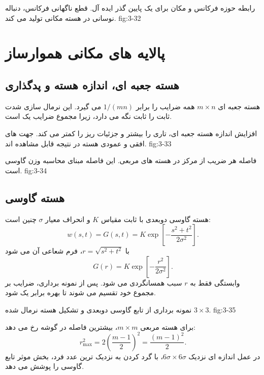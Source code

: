 {رابطه حوزه فرکانس و مکان برای یک پایین گذر ایده آل. قطع ناگهانی فرکانس، دنباله
نوسانی در هسته مکانی تولید می کند.}
{fig:3-32}

\section{پالایه های مکانی هموارساز}

\subsection{هسته جعبه ای، اندازه هسته و پدگذاری}

هسته جعبه ای \(m\times n\) همه ضرایب را برابر \(1/(mn)\) می گیرد. این
نرمال سازی شدت ثابت را ثابت نگه می دارد، زیرا مجموع ضرایب یک است.

{افزایش اندازه هسته جعبه ای، تاری را بیشتر و جزئیات ریز را کمتر می کند. جهت
های افقی و عمودی هسته در نتیجه قابل مشاهده اند.}
{fig:3-33}

{فاصله هر ضریب از مرکز در هسته های مربعی. این فاصله مبنای محاسبه وزن گاوسی
است.}
{fig:3-34}

\subsection{هسته گاوسی}

هسته گاوسی دوبعدی با ثابت مقیاس \(K\) و انحراف معیار \(\sigma\) چنین است:
\begin{equation}
  w(s,t)=G(s,t)=K\exp\!\left[-\frac{s^2+t^2}{2\sigma^2}\right].
  \tag{3-45}\label{eq:3-45}
\end{equation}
با \(r=\sqrt{s^2+t^2}\)، فرم شعاعی آن می شود
\begin{equation}
  G(r)=K\exp\!\left[-\frac{r^2}{2\sigma^2}\right].
  \tag{3-46}\label{eq:3-46}
\end{equation}
وابستگی فقط به \(r\) سبب همسانگردی می شود. پس از نمونه برداری، ضرایب بر مجموع
خود تقسیم می شوند تا بهره  برابر یک شود.

{نمونه برداری از تابع گاوسی دوبعدی و تشکیل هسته نرمال شده \(3\times3\).}
{fig:3-35}

برای هسته مربعی \(m\times m\)، بیشترین فاصله در گوشه رخ می دهد:
\begin{equation}
  r_{\max}^{2}=2\left(\frac{m-1}{2}\right)^2=\frac{(m-1)^2}{2}.
  \tag{3-47}\label{eq:3-47}
\end{equation}
در عمل اندازه ای نزدیک \(6\sigma\times6\sigma\)، با گرد کردن به نزدیک ترین
عدد فرد، بخش موثر تابع گاوسی را پوشش می دهد.

